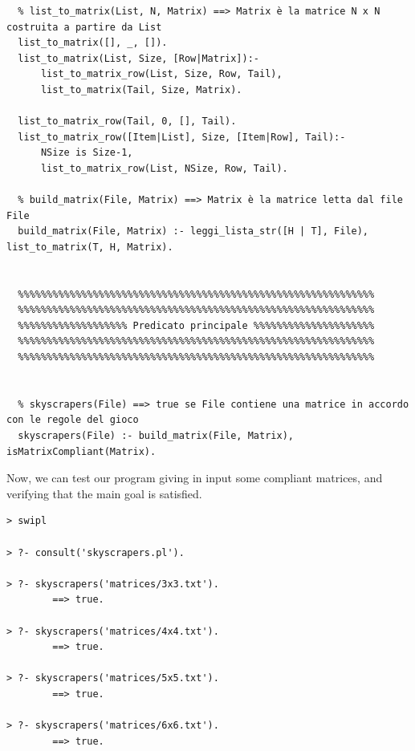 \documentclass{article}
\begin{document}
\begin{lstlisting}
  % list_to_matrix(List, N, Matrix) ==> Matrix è la matrice N x N costruita a partire da List
  list_to_matrix([], _, []).
  list_to_matrix(List, Size, [Row|Matrix]):-
      list_to_matrix_row(List, Size, Row, Tail),
      list_to_matrix(Tail, Size, Matrix).
  
  list_to_matrix_row(Tail, 0, [], Tail).
  list_to_matrix_row([Item|List], Size, [Item|Row], Tail):-
      NSize is Size-1,
      list_to_matrix_row(List, NSize, Row, Tail).
  
  % build_matrix(File, Matrix) ==> Matrix è la matrice letta dal file File
  build_matrix(File, Matrix) :- leggi_lista_str([H | T], File), list_to_matrix(T, H, Matrix).
  
  
  %%%%%%%%%%%%%%%%%%%%%%%%%%%%%%%%%%%%%%%%%%%%%%%%%%%%%%%%%%%%%%
  %%%%%%%%%%%%%%%%%%%%%%%%%%%%%%%%%%%%%%%%%%%%%%%%%%%%%%%%%%%%%%
  %%%%%%%%%%%%%%%%%%% Predicato principale %%%%%%%%%%%%%%%%%%%%%
  %%%%%%%%%%%%%%%%%%%%%%%%%%%%%%%%%%%%%%%%%%%%%%%%%%%%%%%%%%%%%%
  %%%%%%%%%%%%%%%%%%%%%%%%%%%%%%%%%%%%%%%%%%%%%%%%%%%%%%%%%%%%%%
  
  
  % skyscrapers(File) ==> true se File contiene una matrice in accordo con le regole del gioco
  skyscrapers(File) :- build_matrix(File, Matrix), isMatrixCompliant(Matrix).
\end{lstlisting}

\pagebreak

Now, we can test our program giving in input some compliant matrices, and verifying that the main goal is satisfied.\\

\begin{verbatim}
> swipl

> ?- consult('skyscrapers.pl').

> ?- skyscrapers('matrices/3x3.txt').
  		==> true.

> ?- skyscrapers('matrices/4x4.txt').
  		==> true.

> ?- skyscrapers('matrices/5x5.txt').
  		==> true.

> ?- skyscrapers('matrices/6x6.txt').
   		==> true.
\end{verbatim}
\end{document}
